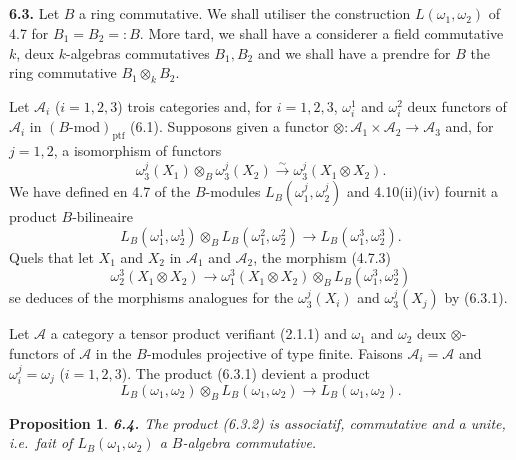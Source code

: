 \documentclass[12pt,a4paper]{article}
\theoremstyle{plain}
\newtheorem{proposition}[theorem]{Proposition}
\theoremstyle{definition}
\theoremstyle{remark}
\begin{document}
\subsection{}

\textbf{6.3.} Let $B$ a ring commutative. We shall utiliser the construction $L(\omega_1,\omega_2)$ of 4.7 for $B_1 = B_2 =: B$. More tard, we shall have a considerer a field commutative $k$, deux $k$-algebras commutatives $B_1, B_2$ and we shall have a prendre for $B$ the ring commutative $B_1 \otimes_k B_2$.

Let $\mathcal{A}_i$ ($i = 1,2,3$) trois categories and, for $i = 1,2,3$, $\omega_i^1$ and $\omega_i^2$ deux functors of $\mathcal{A}_i$ in $(B\text{-mod})_\mathrm{ptf}$ (6.1). Supposons given a functor $\otimes : \mathcal{A}_1 \times \mathcal{A}_2 \to \mathcal{A}_3$ and, for $j = 1,2$, a isomorphism of functors
\[
\omega_3^j(X_1) \otimes_B \omega_3^j(X_2) \xrightarrow{\sim} \omega_3^j(X_1 \otimes X_2).
\]
We have defined en 4.7 of the $B$-modules $L_B(\omega_1^j, \omega_2^j)$ and 4.10(ii)(iv) fournit a product $B$-bilineaire
\begin{equation}\label{eq:6.3.1}
L_B(\omega_1^1, \omega_2^1) \otimes_B L_B(\omega_1^2, \omega_2^2) \longrightarrow L_B(\omega_1^3, \omega_2^3).
\end{equation}
Quels that let $X_1$ and $X_2$ in $\mathcal{A}_1$ and $\mathcal{A}_2$, the morphism (4.7.3)
\[
\omega_2^3(X_1 \otimes X_2) \to \omega_1^3(X_1 \otimes X_2) \otimes_B L_B(\omega_1^3, \omega_2^3)
\]
se deduces of the morphisms analogues for the $\omega_3^j(X_i)$ and $\omega_3^j(X_j)$ by (6.3.1).

Let $\mathcal{A}$ a category a tensor product verifiant (2.1.1) and $\omega_1$ and $\omega_2$ deux $\otimes$-functors of $\mathcal{A}$ in the $B$-modules projective of type finite. Faisons $\mathcal{A}_i = \mathcal{A}$ and $\omega_i^j = \omega_j$ ($i = 1,2,3$). The product (6.3.1) devient a product
\begin{equation}\label{eq:6.3.2}
L_B(\omega_1, \omega_2) \otimes_B L_B(\omega_1, \omega_2) \longrightarrow L_B(\omega_1, \omega_2).
\end{equation}

\begin{proposition}\label{prop:6.4}
\textbf{6.4.} The product (6.3.2) is associatif, commutative and a unite, i.e.~fait of $L_B(\omega_1,\omega_2)$ a $B$-algebra commutative.
\end{proposition}
\end{document}
